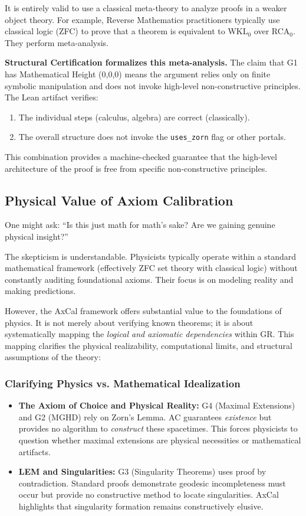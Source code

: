 \documentclass[11pt]{article}
\theoremstyle{definition}
\theoremstyle{remark}
\begin{document}
It is entirely valid to use a classical meta-theory to analyze proofs in a weaker object theory. For example, Reverse Mathematics practitioners typically use classical logic (ZFC) to prove that a theorem is equivalent to WKL$_0$ over RCA$_0$. They perform meta-analysis.

\textbf{Structural Certification formalizes this meta-analysis.} The claim that G1 has Mathematical Height (0,0,0) means the argument relies only on finite symbolic manipulation and does not invoke high-level non-constructive principles. The Lean artifact verifies:
\begin{enumerate}
\item The individual steps (calculus, algebra) are correct (classically).
\item The overall structure does not invoke the \texttt{uses\_zorn} flag or other portals.
\end{enumerate}

This combination provides a machine-checked guarantee that the high-level architecture of the proof is free from specific non-constructive principles.

\subsection{Physical Value of Axiom Calibration}

One might ask: ``Is this just math for math's sake? Are we gaining genuine physical insight?''

The skepticism is understandable. Physicists typically operate within a standard mathematical framework (effectively ZFC set theory with classical logic) without constantly auditing foundational axioms. Their focus is on modeling reality and making predictions.

However, the AxCal framework offers substantial value to the foundations of physics. It is not merely about verifying known theorems; it is about systematically mapping the \emph{logical and axiomatic dependencies} within GR. This mapping clarifies the physical realizability, computational limits, and structural assumptions of the theory:

\subsubsection{Clarifying Physics vs. Mathematical Idealization}

\begin{itemize}
\item \textbf{The Axiom of Choice and Physical Reality:} G4 (Maximal Extensions) and G2 (MGHD) rely on Zorn's Lemma. AC guarantees \emph{existence} but provides no algorithm to \emph{construct} these spacetimes. This forces physicists to question whether maximal extensions are physical necessities or mathematical artifacts.

\item \textbf{LEM and Singularities:} G3 (Singularity Theorems) uses proof by contradiction. Standard proofs demonstrate geodesic incompleteness must occur but provide no constructive method to locate singularities. AxCal highlights that singularity formation remains constructively elusive.
\end{itemize}
\end{document}
